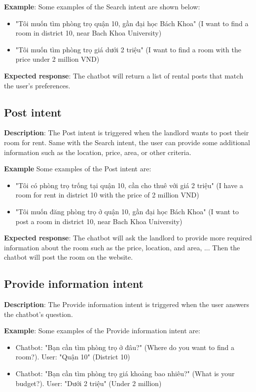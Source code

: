 \noindent \textbf{Example}: Some examples of the Search intent are shown below:
\begin{itemize}
    \item "Tôi muốn tìm phòng trọ quận 10, gần đại học Bách Khoa" (I want to find a room in district 10, near Bach Khoa University)
    \item "Tôi muốn tìm phòng trọ giá dưới 2 triệu" (I want to find a room with the price under 2 million VND)
\end{itemize} 

\noindent \textbf{Expected response}: The chatbot will return a list of rental posts that match the user's preferences.

\subsection{Post intent}
\textbf{Description}: The Post intent is triggered when the landlord wants to post their room for rent. Same with the Search intent, the user can provide some additional information such as the location, price, area, or other criteria. 

\noindent \textbf{Example} Some examples of the Post intent are:
\begin{itemize}
    \item "Tôi có phòng trọ trống tại quận 10, cần cho thuê với giá 2 triệu" (I have a room for rent in district 10 with the price of 2 million VND)
    \item "Tôi muốn đăng phòng trọ ở quận 10, gần đại học Bách Khoa" (I want to post a room in district 10, near Bach Khoa University)
\end{itemize}

\noindent \textbf{Expected response}: The chatbot will ask the landlord to provide more required information about the room such as the price, location, and area, ... Then the chatbot will post the room on the website.

\subsection{Provide information intent}
\textbf{Description}: The Provide information intent is triggered when the user answers the chatbot's question. 

\noindent \textbf{Example}: Some examples of the Provide information intent are:
\begin{itemize}
    \item Chatbot: "Bạn cần tìm phòng trọ ở đâu?" (Where do you want to find a room?). User: "Quận 10" (District 10)
    \item Chatbot: "Bạn cần tìm phòng trọ giá khoảng bao nhiêu?" (What is your budget?). User: "Dưới 2 triệu" (Under 2 million)
\end{itemize}

